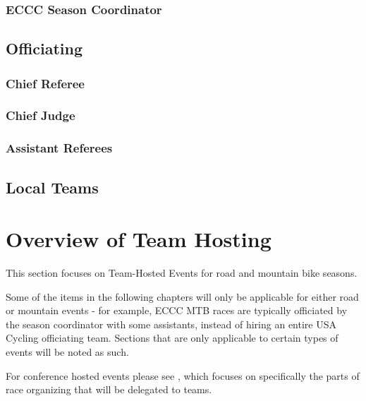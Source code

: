 \documentclass[
  letterpaper, %
  fontsize=10pt, %
  twoside=true,
  chapterentrydots=true, %
  numbers=noenddot,
  fontmethod=tex,
]{kaobook}
\begin{document}
\subsection{ECCC Season Coordinator}
\label{role:eccc_season_coordinator}

\section{Officiating}

\subsection{Chief Referee}
\label{role:chief_ref}

\subsection{Chief Judge}
\label{role:chief_judge}

\subsection{Assistant Referees}
\label{role:assistant_refs}

\section{Local Teams}
\label{role:local_teams}



\setchapterpreamble[u]{\margintoc}
\chapter{Overview of Team Hosting}

\begin{kaobox}[title=Scope]
This section focuses on
Team-Hosted Events %
for road and mountain bike seasons.

Some of the items in the following chapters will only be applicable
for either road or mountain events - for example, ECCC MTB races are typically
officiated by the season coordinator with some assistants, instead of hiring an
entire USA Cycling officiating team.
Sections that are only applicable to certain types of events will be noted as such.

For conference hosted events %
please see ,
which focuses on specifically the parts of race organizing
that will be delegated to teams.
\end{kaobox}
\end{document}
